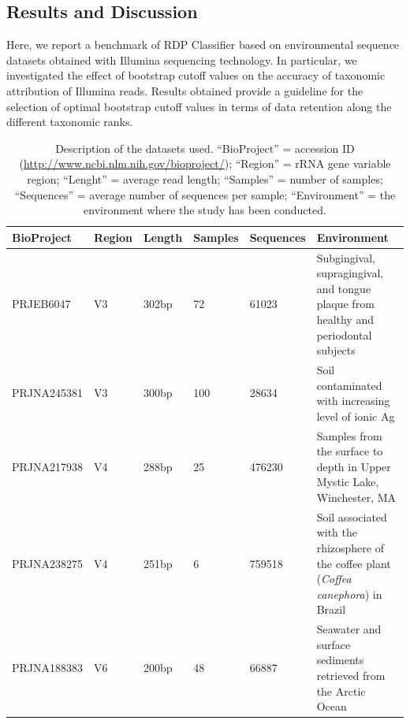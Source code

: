 \subsection{Results and Discussion}
Here, we report a benchmark of RDP Classifier based on environmental sequence datasets obtained with Illumina sequencing technology. In particular, we investigated the effect of bootstrap cutoff values on the accuracy of taxonomic attribution of Illumina reads. Results obtained provide a guideline for the selection of optimal bootstrap cutoff values in terms of data retention along the different taxonomic ranks.\\
\begin{table}
\centering
\scriptsize
\begin{tabular}{ p{} p{} p{} p{} p{} p{} }
\hline
BioProject & Region & Length & Samples & Sequences & Environment\\
\hline\hline
PRJEB6047 & V3 & 302bp & 72 & 61023 & Subgingival, supragingival, and tongue plaque from healthy and periodontal subjects \\
PRJNA245381 & V3 & 300bp & 100 & 28634 & Soil contaminated with increasing level of ionic Ag\\
PRJNA217938 & V4 & 288bp & 25 & 476230 & Samples from the surface to depth in Upper Mystic Lake, Winchester, MA\\
PRJNA238275 & V4 & 251bp & 6 & 759518 & Soil associated with the rhizosphere of the coffee plant (\textit{Coffea canephora}) in Brazil\\
PRJNA188383 & V6 & 200bp & 48 & 66887 & Seawater and surface sediments retrieved from the Arctic Ocean\\\hline 
\end{tabular}
\caption{\label{tab:1rdp}Description of the datasets used. ``BioProject'' = accession ID (\href{http://www.ncbi.nlm.nih.gov/bioproject/}{http://\-www.\-ncbi.\-nlm.\-nih\-.gov/\-biopro\-ject/}); ``Region'' = rRNA gene variable region; ``Lenght'' = average read length; ``Samples'' = number of samples; ``Sequences'' = average number of sequences per sample; ``Environment'' = the environment where the study has been conducted.}
\end{table}
